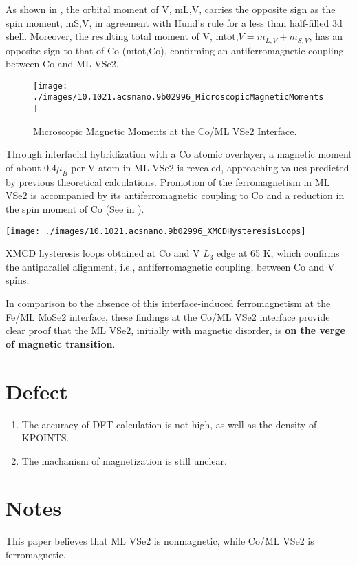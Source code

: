 As shown in , the orbital moment of V, mL,V, carries the opposite sign as the spin moment, mS,V, in agreement with Hund’s rule for a less than half-filled 3d shell. Moreover, the resulting total moment of V, mtot,$V = m_{L,V} + m_{S,V}$, has an opposite sign to that of Co (mtot,Co), confirming an antiferromagnetic coupling between Co and ML VSe2.

\begin{figure}[ht] 
    \texttt{[image: ./images/10.1021.acsnano.9b02996\_MicroscopicMagneticMoments]}
	\caption[Microscopic Magnetic Moments at the Co/ML VSe2 Interface]{
        Microscopic Magnetic Moments at the Co/ML VSe2 Interface.
	}
\end{figure}

Through interfacial hybridization with a Co atomic overlayer, a magnetic moment of about $0.4 \mu_B$ per V atom in ML VSe2 is revealed, approaching values predicted by previous theoretical calculations. Promotion of the ferromagnetism in ML VSe2 is accompanied by its antiferromagnetic coupling to Co and a reduction in the spin moment of Co (See in ). 

\begin{marginfigure}
    \texttt{[image: ./images/10.1021.acsnano.9b02996\_XMCDHysteresisLoops]}
	\caption[XMCD hysteresis loops obtained at Co and V $L_3$ edge at 65 K]{
        XMCD hysteresis loops obtained at Co and V $L_3$ edge at 65 K, which confirms the antiparallel alignment, i.e., antiferromagnetic coupling, between Co and V spins.
	}
\end{marginfigure}

In comparison to the absence of this interface-induced ferromagnetism at the Fe/ML MoSe2 interface, these findings at the Co/ML VSe2 interface provide clear proof that the ML VSe2, initially with magnetic disorder, is \textbf{on the verge of magnetic transition}.

\section{Defect}
\begin{enumerate}
    \item The accuracy of DFT calculation is not high, as well as the density of KPOINTS.
    \item The machanism of magnetization is still unclear.
\end{enumerate}

\section{Notes}
This paper believes that ML VSe2 is nonmagnetic, while Co/ML VSe2 is ferromagnetic.
